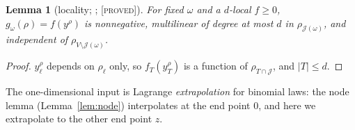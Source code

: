 \documentclass[10pt,reqno]{amsart}
\newtheorem{lemma}[theorem]{Lemma}
\theoremstyle{definition}
\theoremstyle{remark}
\newcommand{\lab}[1]{\textup{[\textsc{#1}]}}
\begin{document}
\begin{lemma}[locality; {\cite[Lemma~2.2]{KA}}; \lab{proved}]\label{lem:klocal}
For fixed $\omega$ and a $d$-local $f\geq0$, $g_\omega(\rho)=f(y^\rho)$ is
nonnegative, multilinear of degree at most $d$ in $\rho_{\mathcal J(\omega)}$, and
independent of $\rho_{V\setminus \mathcal J(\omega)}$.
\end{lemma}
\begin{proof}
$y^\rho_\ell$ depends on $\rho_\ell$ only, so $f_T(y^\rho_T)$ is a function
of $\rho_{T\cap\mathcal J}$, and $|T|\leq d$.
\end{proof}

The one-dimensional input is Lagrange \emph{extrapolation} for binomial
laws: the node lemma (Lemma~\ref{lem:node}) interpolates at the end point
$0$, and here we extrapolate to the other end point $z$.
\end{document}
